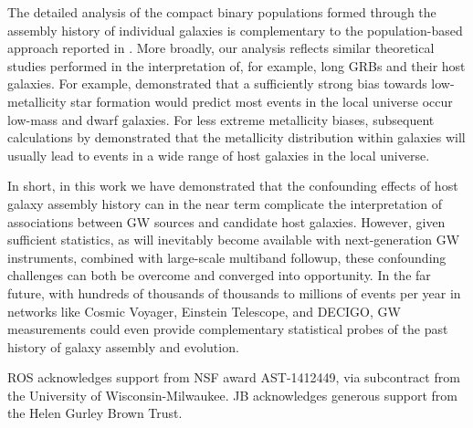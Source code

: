 \documentclass[nofootinbib,twocolumn,prd]{emulateapj}
\newcommand\jillianremark[1]{{\color{blue}#1}}
\begin{document}
The detailed analysis of the compact binary populations formed through the assembly history of individual galaxies is
complementary to the  population-based approach reported in
\cite{2016arXiv160508783L}.     More broadly, our analysis reflects  similar theoretical studies performed in the interpretation of, for
example, long GRBs and their host galaxies. 
For example, \cite{2009ApJ...702..377K} demonstrated that a sufficiently strong bias towards low-metallicity star formation would predict
most  events in the local universe occur low-mass and dwarf galaxies.
For less extreme metallicity biases, subsequent calculations by  \citet{2011MNRAS.417..567N} demonstrated that the
metallicity distribution within galaxies will usually lead to events in a wide range of host galaxies in the local universe.


In short, in this work we have demonstrated that  the confounding effects of host galaxy assembly history can in the
near term complicate the interpretation of associations between GW sources and candidate host galaxies.   However, given sufficient
statistics, as will inevitably become available with next-generation GW instruments, combined with large-scale
multiband followup, these confounding challenges can  both be overcome and converged into opportunity.   In the far future,  with hundreds of thousands of thousands to millions of events per year in
networks like Cosmic Voyager, Einstein Telescope, and DECIGO, GW measurements could even  provide complementary statistical probes of the past history of
galaxy assembly and evolution.  
%












\begin{acknowledgements}
ROS acknowledges support from NSF award AST-1412449, via subcontract from the University of Wisconsin-Milwaukee.
%
JB acknowledges generous support  from the Helen Gurley Brown Trust.
\end{acknowledgements}







\end{document}
